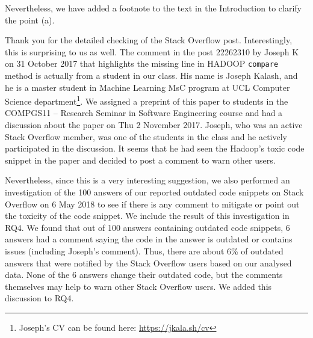 \documentclass[a4paper,twoside,10pt]{reviewresponse}
\begin{document}
Nevertheless, we have added a footnote to the text in the Introduction to
clarify the point (a).


Thank you for the detailed checking of the Stack Overflow post. Interestingly,
this is surprising to us as well. The comment in the post 22262310 by Joseph K
on 31 October 2017 that highlights the missing line in HADOOP \texttt{compare}
method is actually from a student in our class. His name is Joseph Kalash, and he
is a master student in Machine Learning MsC program at UCL Computer Science
department\footnote{Joseph's CV can be found here: \url{https://jkala.sh/cv}}.
We assigned a preprint of this paper to students in the COMPGS11 -- Research
Seminar in Software Engineering course and had a discussion about the paper on
Thu 2 November 2017. Joseph, who was an active Stack Overflow member, was one of
the students in the class and he actively participated in the discussion. It
seems that he had seen the Hadoop's toxic code snippet in the paper and decided
to post a comment to warn other users.

Nevertheless, since this is a very interesting suggestion, we also performed an
investigation of the 100 answers of our reported outdated code snippets on Stack
Overflow on 6 May 2018 to see if there is any comment to mitigate or point out
the toxicity of the code snippet. We include the result of this investigation in
RQ4. We found that out of 100 answers containing outdated code snippets,
6 answers had a comment saying the code in the answer is
outdated or contains issues (including Joseph's comment). Thus, there are about
6\% of outdated answers that were notified by the Stack Overflow users based on
our analysed data. None of the 6 answers change their outdated code, but the
comments themselves may help to warn other Stack Overflow users. We added this
discussion to RQ4.

\end{document}
